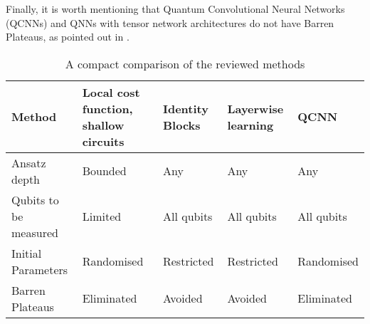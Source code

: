 Finally, it is worth mentioning that Quantum Convolutional Neural Networks (QCNNs) and QNNs with tensor network architectures do not have Barren Plateaus, as pointed out in \cite{congQuantumConvolutionalNeural2019}.

\begin{table}[]
    \centering
    \begin{tabular}{|p{2cm}|p{3cm}|p{3cm}|p{3cm}|p{3cm}|}
        \hline
        Method              & Local cost function, shallow circuits & Identity Blocks   & Layerwise learning    & QCNN \\
        \hline
        Ansatz depth        & Bounded                               & Any               & Any                   & Any \\
        \hline
        Qubits to be measured    & Limited                          & All qubits        & All qubits            & All qubits \\
        \hline
        Initial Parameters  & Randomised                            & Restricted        & Restricted            & Randomised \\
        \hline
        Barren Plateaus     & Eliminated                            & Avoided           & Avoided               & Eliminated \\
        \hline
    \end{tabular}
    \caption{A compact comparison of the reviewed methods}
    \label{quick comparison of methods}
\end{table}